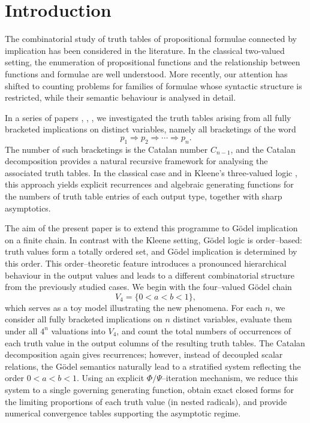 \documentclass[11pt]{article}
\begin{document}
\newpage
 

\setcounter{tocdepth}{1} 
\tableofcontents
\bigskip

\newpage
\section{Introduction}



The combinatorial study of truth tables of propositional formulae connected by implication has been considered in the literature. In the classical two-valued setting, the
enumeration of propositional functions and the relationship between functions and
formulae are well understood. More recently, our attention has shifted to counting problems for families of formulae whose syntactic structure is restricted, while their semantic behaviour is analysed in detail.

In a series of papers \cite{CameronYildiz2010},  \cite{Yildiz2011b}, \cite{Yildiz2012}, we investigated the truth tables arising from all
fully bracketed implications on distinct variables, namely all bracketings of the word
\[
p_1 \Rightarrow p_2 \Rightarrow \cdots \Rightarrow p_n .
\]
The number of such bracketings is the Catalan number $C_{n-1}$, and the Catalan
decomposition provides a natural recursive framework for analysing the associated truth
tables. In the classical case and in Kleene's three-valued logic 
\cite{Yildiz2020}, this approach
yields explicit recurrences and algebraic generating functions for the numbers of truth
table entries of each output type, together with sharp asymptotics.


The aim of the present paper is to extend this programme to Gödel implication on a finite
chain. In contrast with the Kleene setting, Gödel logic is order--based: truth values form a
totally ordered set, and Gödel implication is determined by this order. This order--theoretic feature introduces a pronounced hierarchical behaviour in the output values and leads to a different combinatorial structure from the previously studied cases.
We begin with the four--valued Gödel chain
\[
V_4=\{0<a<b<1\},
\]
which serves as a toy model illustrating the new phenomena. For each \(n\), we consider all
fully bracketed implications on \(n\) distinct variables, evaluate them under all \(4^n\)
valuations into \(V_4\), and count the total numbers of occurrences of each truth value in the
output columns of the resulting truth tables. The Catalan decomposition again gives
recurrences; however, instead of decoupled scalar relations, the Gödel semantics naturally
lead to a stratified system reflecting the order \(0<a<b<1\). Using an explicit
\(\Phi/\Psi\)--iteration mechanism, we reduce this system to a single governing generating
function, obtain exact closed forms for the limiting proportions of each truth value (in nested
radicals), and provide numerical convergence tables supporting the asymptotic regime.
\end{document}
